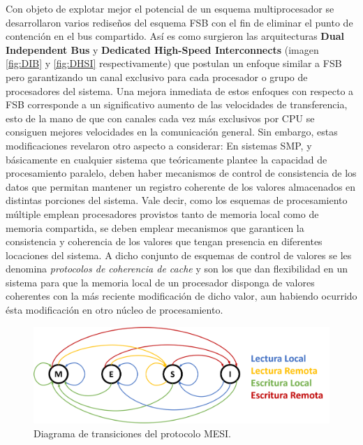 Con objeto de explotar mejor el potencial de un esquema multiprocesador se desarrollaron varios rediseños del esquema FSB con el fin de eliminar el punto de contención en el bus compartido. Así es como surgieron las arquitecturas \textbf{Dual Independent Bus} y \textbf{Dedicated High-Speed Interconnects} (imagen \ref{fig:DIB} y \ref{fig:DHSI} respectivamente) que postulan un enfoque similar a FSB pero garantizando un canal exclusivo para cada procesador o grupo de procesadores del sistema. Una mejora inmediata de estos enfoques con respecto a FSB corresponde a un significativo aumento de las velocidades de transferencia, esto de la mano de que con canales cada vez más exclusivos por CPU se consiguen mejores velocidades en la comunicación general. Sin embargo, estas modificaciones revelaron otro aspecto a considerar: En sistemas SMP, y básicamente en cualquier sistema que teóricamente plantee la capacidad de procesamiento paralelo, deben haber mecanismos de control de consistencia de los datos que permitan mantener un registro coherente de los valores almacenados en distintas porciones del sistema. Vale decir, como los esquemas de procesamiento múltiple emplean procesadores provistos tanto de memoria local como de memoria compartida, se deben emplear mecanismos que garanticen la consistencia y coherencia de los valores que tengan presencia en diferentes locaciones del sistema. A dicho conjunto de esquemas de control de valores se les denomina \emph{protocolos de coherencia de cache} y son los que dan flexibilidad en un sistema para que la memoria local de un procesador disponga de valores coherentes con la más reciente modificación de dicho valor, aun habiendo ocurrido ésta modificación en otro núcleo de procesamiento.

\begin{figure}[!h]
	\centering
	\includegraphics[scale=0.3]{imagenes/MESI.png}
	\caption{Diagrama de transiciones del protocolo MESI.}
	\label{fig:MESI}
\end{figure}

